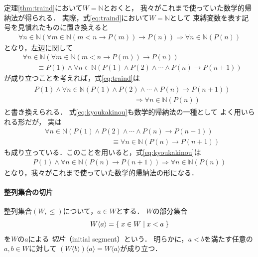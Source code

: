    定理\ref{thm:traind}において$W= \mathbb{N}$とおくと，
   我々がこれまで使っていた数学的帰納法が得られる．
   実際，式\eqref{eq:traind}において$W = \mathbb{N}$として
   束縛変数を表す記号を見慣れたものに置き換えると
   \begin{align*}
     \forall n \in \mathbb{N} (\forall m \in \mathbb{N} (m< n \to P(m) ) \to P(n))
     \Longrightarrow \forall n \in \mathbb{N} (P(n))
   \end{align*}
   となり，左辺に関して
   \begin{align*}
     & \forall n \in \mathbb{N} (\forall m \in \mathbb{N} (m<n \to P(m) ) \to P(n))  \\
     & \qquad \equiv P(1) \land \forall n \in \mathbb{N} 
     (P(1) \land P(2) \land \cdots \land P(n) \to P(n+1) )
   \end{align*}
   が成り立つことを考えれば，式\eqref{eq:traind}は
   \begin{align}
     \begin{aligned}
       & P(1) \land \forall n \in \mathbb{N} (P(1) \land P(2) \land \cdots 
       \land P(n) \to P(n+1) ) \\ 
       & \hspace{6cm} \Longrightarrow \forall n \in \mathbb{N} (P(n))
     \end{aligned}  
     \label{eq:kyoukakinou}
   \end{align}
   と書き換えられる．
   式\eqref{eq:kyoukakinou}も数学的帰納法の一種として
   よく用いられる形だが，
   実は
   \begin{align*}
     & \forall n \in \mathbb{N} (P(1) \land P(2) \land \cdots \land P(n) \to P(n+1) ) \\
     & \hspace{4cm} \equiv \forall n \in \mathbb{N} (P(n) \to P(n+1))
   \end{align*}
   も成り立っている．このことを用いると，式\eqref{eq:kyoukakinou}は
   \begin{align}
     P(1) \land \forall n \in \mathbb{N} (P(n) \to P(n+1) )
     \Longrightarrow \forall n \in \mathbb{N} (P(n))
     \label{eq:mathind}
   \end{align}
   となり，我々がこれまで使っていた数学的帰納法の形になる．


   


  \paragraph{整列集合の切片}
  整列集合$(W, {\leq})$について，$a \in W$とする．
  $W$の部分集合
  \begin{align}
    W \langle a \rangle = \Set{ x \in W \mid x <a}
    \label{eq:wsepen}
  \end{align}
  を$W$の$a$による
  \emph{切片}（initial segment）という．
  明らかに，$a<b$を満たす任意の$a,b \in W$に対して
  $(W \langle b \rangle ) \langle a \rangle = W \langle a \rangle$が成り立つ．

